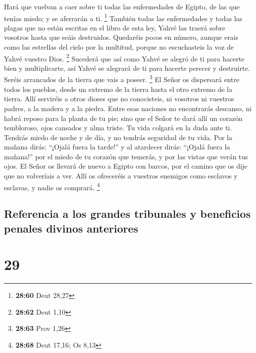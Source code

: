 Hará que vuelvan a caer sobre ti todas las enfermedades de Egipto, de
las que tenías miedo; y se aferrarán a ti. \footnote{\textbf{28:60} Deut
  28,27}  También todas las enfermedades y todas las
plagas que no están escritas en el libro de esta ley, Yahvé las traerá
sobre vosotros hasta que seáis destruidos.  Quedaréis
pocos en número, aunque erais como las estrellas del cielo por la
multitud, porque no escuchasteis la voz de Yahvé vuestro Dios.
\footnote{\textbf{28:62} Deut 1,10}  Sucederá que así
como Yahvé se alegró de ti para hacerte bien y multiplicarte, así Yahvé
se alegrará de ti para hacerte perecer y destruirte. Seréis arrancados
de la tierra que vais a poseer. \footnote{\textbf{28:63} Prov 1,26}
 El Señor os dispersará entre todos los pueblos, desde un
extremo de la tierra hasta el otro extremo de la tierra. Allí serviréis
a otros dioses que no conocisteis, ni vosotros ni vuestros padres, a la
madera y a la piedra.  Entre esas naciones no encontrarás
descanso, ni habrá reposo para la planta de tu pie; sino que el Señor te
dará allí un corazón tembloroso, ojos cansados y alma triste.
 Tu vida colgará en la duda ante ti. Tendrás miedo de
noche y de día, y no tendrás seguridad de tu vida.  Por
la mañana dirás: ``¡Ojalá fuera la tarde!'' y al atardecer dirás:
``¡Ojalá fuera la mañana!'' por el miedo de tu corazón que temerás, y
por las vistas que verán tus ojos.  El Señor os llevará
de nuevo a Egipto con barcos, por el camino que os dije que no
volveríais a ver. Allí os ofreceréis a vuestros enemigos como esclavos y
esclavas, y nadie os comprará. \footnote{\textbf{28:68} Deut 17,16; Os
  8,13}

\hypertarget{referencia-a-los-grandes-tribunales-y-beneficios-penales-divinos-anteriores}{%
\subsection{Referencia a los grandes tribunales y beneficios penales
divinos
anteriores}\label{referencia-a-los-grandes-tribunales-y-beneficios-penales-divinos-anteriores}}

\hypertarget{section-28}{%
\section{29}\label{section-28}}


